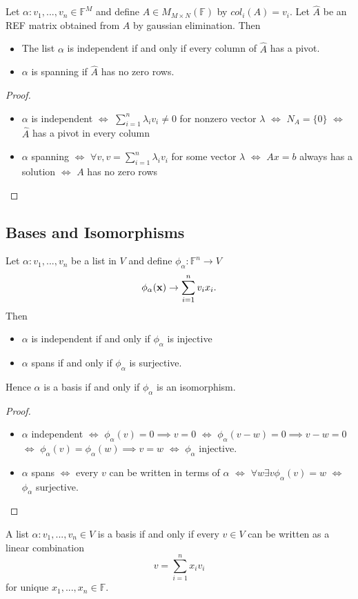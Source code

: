 \begin{prop}
  Let $\alpha: v_1, ..., v_n \in \mathbb{F}^M$ and define $A \in M_{M \times N}(\mathbb{F})$ by $col_i(A) = v_i$. Let $\hat{A}$ be an REF matrix obtained from $A$ by gaussian elimination. Then

  \begin{itemize}
    \item The list $\alpha$ is independent if and only if every column of $\hat{A}$ has a pivot.
    \item $\alpha$ is spanning if $\hat{A}$ has no zero rows.
  \end{itemize}
\end{prop}
\begin{proof} $ $
    \begin{itemize}
    \item $\alpha$ is independent $\iff$ $\sum_{i=1}^n \lambda_i v_i \not = 0$ for nonzero vector $\lambda$ $\iff$ $N_A = \{0\}$ $\iff$ $\hat{A}$ has a pivot in every column
    \item $\alpha$ spanning $\iff$ $\forall v, v = \sum_{i = 1}^n \lambda_i v_i$ for some vector $\lambda$ $\iff$ $A x = b$ always has a solution $\iff$ $A$ has no zero rows
    \end{itemize}
\end{proof}

\subsection{Bases and Isomorphisms}

\begin{prop} 
  Let $\alpha: v_1,...,v_n$ be a list in $V$ and define
  $\phi_\alpha : \mathbb{F}^n \rightarrow V$
  \[\phi_\alpha({\bf x}) \rightarrow \sum_{i=1}^n v_i x_i.\]
  Then

  \begin{itemize}
    \item $\alpha$ is independent if and only if $\phi_\alpha$ is injective
    \item $\alpha$ spans if and only if $\phi_\alpha$ is surjective.
  \end{itemize}

  Hence $\alpha$ is a basis if and only if $\phi_\alpha$ is an isomorphism.
\end{prop}
\begin{proof} $ $
    \begin{itemize} 
      \item $\alpha$ independent $\iff$ $\phi_\alpha(v) = 0 \implies v = 0$ $\iff$ $\phi_\alpha(v - w) = 0 \implies v - w = 0$ $\iff$ $\phi_\alpha(v)=\phi_\alpha(w) \implies v = w$ $\iff$ $\phi_\alpha$ injective.
      \item $\alpha$ spans $\iff$ every $v$ can be written in terms of $\alpha$ $\iff$ $\forall w \exists v \phi_\alpha(v) = w$ $\iff$ $\phi_\alpha$ surjective.
    \end{itemize}
\end{proof}

\begin{corollary}
    A list $\alpha: v_1, ..., v_n \in V$ is a basis if and only if every $v \in V$ can be written as a linear combination
    \[v = \sum_{i=1}^n x_i v_i\]
    for unique $x_1,...,x_n \in \mathbb{F}.$
\end{corollary}
